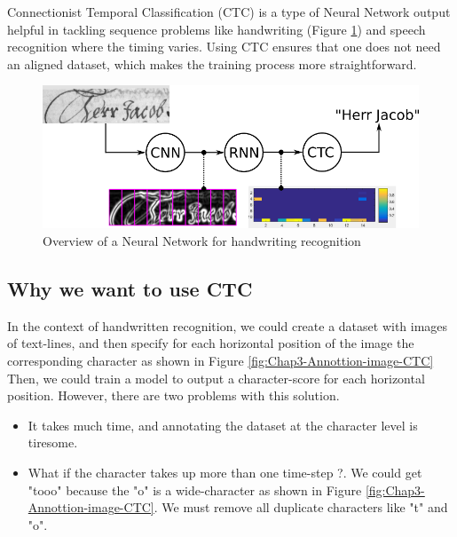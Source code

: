 Connectionist Temporal Classification (CTC) \cite{hannun2017sequence} is a type of Neural Network output helpful in tackling sequence problems like handwriting (Figure \ref{fig:Chap3-Overview-CTC}) and speech recognition where the timing varies. Using CTC ensures that one does not need an aligned dataset, which makes the training process
more straightforward.

\begin{figure}[H]
	\centering
	\includegraphics[width=\textwidth]{img/Chap3/Overview-CTC}
	\caption{ Overview of a Neural Network for handwriting recognition }
	\label{fig:Chap3-Overview-CTC}
\end{figure}

\subsection{Why we want to use CTC}

In the context of handwritten recognition, we could create a dataset with images of text-lines, and then specify for each horizontal position of the image the corresponding character as shown in Figure \ref{fig:Chap3-Annottion-image-CTC} Then, we could train a model to output a character-score for each horizontal position. However, there are two problems with this solution.

\begin{itemize}
	\item It takes much time, and annotating the dataset at the character level is tiresome.
	\item What if the character takes up more than one time-step ?. We could get "tooo" because the "o" is a wide-character as shown in Figure \ref{fig:Chap3-Annottion-image-CTC}. We must remove all duplicate characters like "t" and "o".
\end{itemize}

